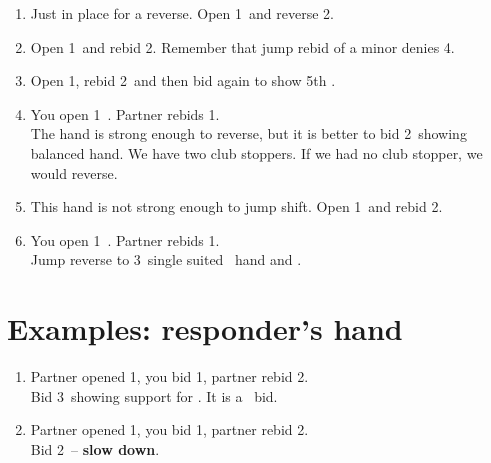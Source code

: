 \documentclass[12pt, a4paper]{article}
\begin{document}
\begin{enumerate}
    \item
        Just in place for a reverse. Open 1\clubs\ and reverse 2\hearts.
    \item
        Open 1\diams\ and rebid 2\hearts. Remember that jump rebid of a minor 
        denies 4\majs.
    \item 
        Open 1\clubs, rebid 2\hearts\ and then bid again to show 5th \hearts.
    \item 
        You open 1\diams\ . Partner rebids 1\spades. \\
        The hand is strong enough to reverse, but
        it is better to bid 2\nt\ showing balanced hand. We have two club stoppers. If we had no
        club stopper, we would reverse.
    \item 
        This hand is not strong enough to jump shift. Open 1\diams\ and rebid 2\clubs.
    \item
        You open 1\clubs\ . Partner rebids 1\spades. \\
        Jump reverse to 3\diams\ single suited \clubs\ hand and \gf.
        
\end{enumerate}

\section{Examples: responder's hand}
\begin{enumerate}
    \item
        Partner opened 1\diams, you bid 1\spades, partner rebid 2\hearts. \\
        Bid 3\diams\ showing support for \diams. It is a \gf\ bid.
    \item
        Partner opened 1\diams, you bid 1\spades, partner rebid 2\hearts. \\
        Bid 2\nt\ -- \textbf{slow down}.
\end{enumerate}
\end{document}
